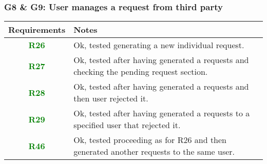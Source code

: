 \subsubsection{G8 \& G9: User manages a request from third party}
  \begin{adjustwidth}{1cm}{}
        \begin{longtable}{|c|p{}|}
            \hline
            \textbf{Requirements} & \textbf{Notes} \\
            \hline
            \textbf{\textcolor{green}{R26}} & Ok, tested generating a new individual request.  \\
            \hline
            \textbf{\textcolor{green}{R27}} & Ok, tested after having generated a requests and checking  the pending request section. \\
            \hline
            \textbf{\textcolor{green}{R28}} & Ok, tested after having generated a requests and then user rejected it. \\
            \hline
            \textbf{\textcolor{green}{R29}} & Ok, tested after having generated a requests to a specified user that rejected it.\\
            \hline
            \textbf{\textcolor{green}{R46}} & Ok, tested proceeding as for R26 and then generated another requests to the same user.  \\
            \hline            
            
            
        \end{longtable}
    \end{adjustwidth}
    
